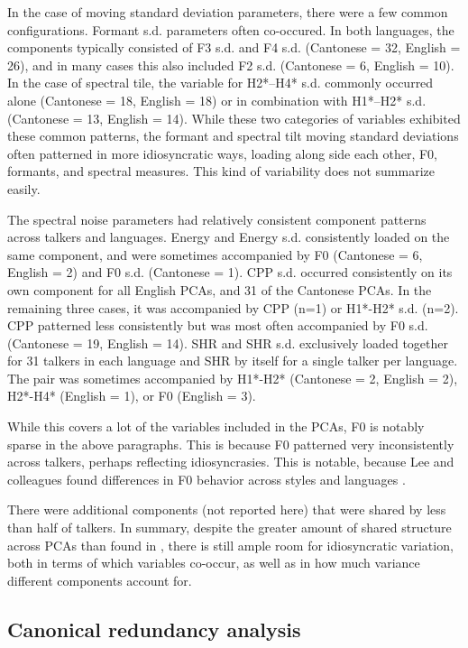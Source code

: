 In the case of moving standard deviation parameters, there were a few common configurations. Formant s.d. parameters often co-occured. In both languages, the components typically consisted of F3 s.d. and F4 s.d. (Cantonese = 32, English = 26), and in many cases this also included F2 s.d. (Cantonese = 6, English = 10). In the case of spectral tile, the variable for H2*--H4* s.d. commonly occurred alone (Cantonese = 18, English = 18) or in combination with H1*--H2* s.d. (Cantonese = 13, English = 14). While these two categories of variables exhibited these common patterns, the formant and spectral tilt moving standard deviations often patterned in more idiosyncratic ways, loading along side each other, F0, formants, and spectral measures. This kind of variability does not summarize easily.

The spectral noise parameters had relatively consistent component patterns across talkers and languages. Energy and Energy s.d. consistently loaded on the same component, and were sometimes accompanied by F0 (Cantonese = 6, English = 2) and F0 s.d. (Cantonese = 1). CPP s.d. occurred consistently on its own component for all English PCAs, and 31 of the Cantonese PCAs. In the remaining three cases, it was accompanied by CPP (n=1) or H1*-H2* s.d. (n=2). CPP patterned less consistently but was most often accompanied by F0 s.d. (Cantonese = 19, English = 14). SHR and SHR s.d. exclusively loaded together for 31 talkers in each language and SHR by itself for a single talker per language. The pair was sometimes accompanied by H1*-H2* (Cantonese = 2, English = 2), H2*-H4* (English = 1), or F0 (English = 3). 

While this covers a lot of the variables included in the PCAs, F0 is notably sparse in the above paragraphs. This is because F0 patterned very inconsistently across talkers, perhaps reflecting idiosyncrasies. This is notable, because Lee and colleagues found differences in F0 behavior across styles and languages \citep{lee_2019_acoustic,lee_2019_spontaneous,lee_2020_language}. %

There were additional components (not reported here) that were shared by less than half of talkers. In summary, despite the greater amount of shared structure across PCAs than found in \citet{lee_2019_acoustic}, there is still ample room for idiosyncratic variation, both in terms of which variables co-occur, as well as in how much variance different components account for. 

\subsection{Canonical redundancy analysis}\label{ch3:sec:cca}
